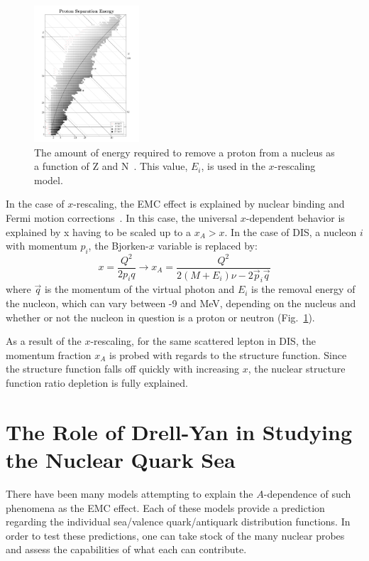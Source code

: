 \begin{figure}
	\centering
	\includegraphics[width=0.35\textwidth]{figures/background/removal-energy.pdf}
	\caption{The amount of energy required to remove a proton from a nucleus as a function of Z and N~\cite{Dommelen}. This value, $E_i$, is used in the $x$-rescaling model.}
	\label{fig:nucleon-removal}
\end{figure}
In the case of $x$-rescaling, the EMC effect is explained by nuclear binding and Fermi motion corrections~\cite{GarciaCanal:1984eh, Staszel:1983qx}. In this case, the universal $x$-dependent behavior is explained by x having to be scaled up to a $x_A>x$. In the case of DIS, a nucleon $i$ with momentum $p_i$, the Bjorken-$x$ variable is replaced by:
\begin{equation}
x = \frac{Q^2}{2 p_i q} \rightarrow x_A = \frac{Q^2}{2(M+E_i)\nu - 2 \vec{p}_i \vec{q}}
\end{equation} 
where $\vec{q}$ is the momentum of the virtual photon and $E_i$ is the removal energy of the nucleon, which can vary between -9 and \unit[-27]{MeV}, depending on the nucleus and whether or not the nucleon in question is a proton or neutron (Fig.~\ref{fig:nucleon-removal}).

As a result of the $x$-rescaling, for the same scattered lepton in DIS, the momentum fraction $x_A$ is probed with regards to the structure function. Since the structure function falls off quickly with increasing $x$, the nuclear structure function ratio depletion is fully explained.

\section{The Role of Drell-Yan in Studying the Nuclear Quark Sea}

There have been many models attempting to explain the $A$-dependence of such phenomena as the EMC effect. Each of these models provide a prediction regarding the individual sea/valence quark/antiquark distribution functions. In order to test these predictions, one can take stock of the many nuclear probes and assess the capabilities of what each can contribute.

